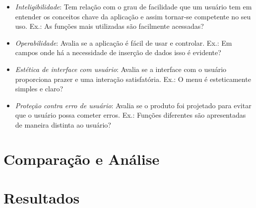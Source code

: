 \begin{itemize}
    \begin{itemize}
        \item \textit{Inteligibilidade}: Tem relação com o grau de facilidade que um usuário tem em entender os conceitos chave da aplicação e assim tornar-se competente no seu uso. Ex.: As funções mais utilizadas são facilmente acessadas?
        \item \textit{Operabilidade}: Avalia se a aplicação é fácil de usar e controlar. Ex.: Em campos onde há a necessidade de inserção de dados isso é evidente?
        \item \textit{Estética de interface com usuário}: Avalia se a interface com o usuário proporciona prazer e uma interação satisfatória. Ex.: O menu é esteticamente simples e claro?
        \item \textit{Proteção contra erro de usuário}: Avalia se o produto foi projetado para evitar que o usuário possa cometer erros. Ex.: Funções diferentes são apresentadas de maneira distinta ao usuário?
    \end{itemize}
\end{itemize}

\section{Comparação e Análise}

\section{Resultados}
